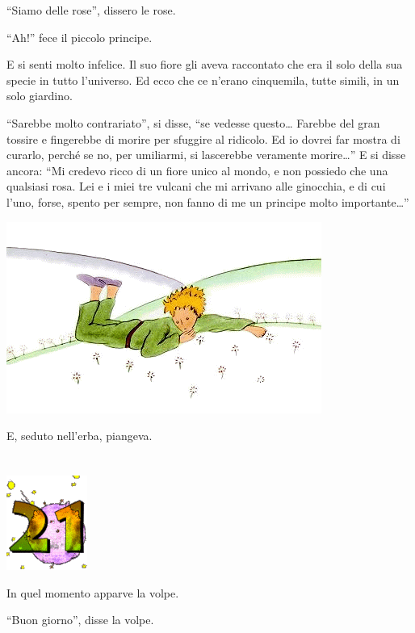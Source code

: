 \documentclass[11pt]{scrbook}
\begin{document}
``Siamo delle rose'', dissero le rose.

``Ah!'' fece il piccolo principe.

E si senti molto infelice. Il suo fiore gli aveva raccontato che era il solo della sua specie in tutto l'universo. Ed ecco che ce n'erano cinquemila, tutte simili, in un solo giardino.

``Sarebbe molto contrariato'', si disse, ``se vedesse questo\ldots{} Farebbe del gran tossire e fingerebbe di morire per sfuggire al ridicolo. Ed io dovrei far mostra di curarlo, perché se no, per umiliarmi, si lascerebbe veramente morire\ldots{}'' E si disse ancora: ``Mi credevo ricco di un fiore unico al mondo, e non possiedo che una qualsiasi rosa. Lei e i miei tre vulcani che mi arrivano alle ginocchia, e di cui l'uno, forse, spento per sempre, non fanno di me un principe molto importante\ldots{}''

\begin{center}
\includegraphics{img/20b}
\end{center}

E, seduto nell'erba, piangeva.

\chapter{}
\begin{center}
\includegraphics{img/chapter21}
\end{center}

In quel momento apparve la volpe.

``Buon giorno'', disse la volpe.
\end{document}

